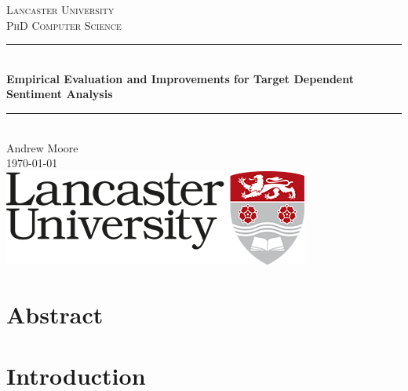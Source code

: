 \documentclass[11pt]{report}
\begin{document}
\begin{titlepage}

\newcommand{\HRule}{\rule{\linewidth}{0.5mm}} %

\center %

\textsc{\LARGE Lancaster University}\\[1.5cm] 
\textsc{\Large PhD Computer Science}\\[0.5cm]

\HRule \\[0.4cm]
{ \huge \bfseries Empirical Evaluation and Improvements for Target Dependent Sentiment Analysis}\\[0.4cm] %
\HRule \\[1.5cm]
 
\large Andrew Moore
\hfill \\[0.7cm]
{\large \today}\\[2cm]

\includegraphics{main/uni_logo.png}\\[1cm] 

\vfill %

\end{titlepage}

\chapter*{Abstract}


\tableofcontents

\chapter{Introduction}
\end{document}
